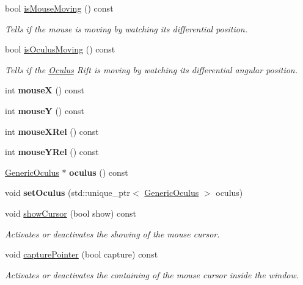 \begin{DoxyCompactItemize}
\item 
bool \hyperlink{classInput_a3b6c9efa09e69765fd65d1a33bccc8d2}{is\+Mouse\+Moving} () const 
\begin{DoxyCompactList}\small\item\em Tells if the mouse is moving by watching its differential position. \end{DoxyCompactList}\item 
bool \hyperlink{classInput_a58c6efa3f40b91303082f110de53d3f6}{is\+Oculus\+Moving} () const 
\begin{DoxyCompactList}\small\item\em Tells if the \hyperlink{classOculus}{Oculus} Rift is moving by watching its differential angular position. \end{DoxyCompactList}\item 
\hypertarget{classInput_a8ac03b246ba70872b33f8d07e9d112ea}{}int {\bfseries mouse\+X} () const \label{classInput_a8ac03b246ba70872b33f8d07e9d112ea}

\item 
\hypertarget{classInput_a3fc2746389b41d399382a70ef9274293}{}int {\bfseries mouse\+Y} () const \label{classInput_a3fc2746389b41d399382a70ef9274293}

\item 
\hypertarget{classInput_a4ea40bc98f495e60ca31b2c30e4db881}{}int {\bfseries mouse\+X\+Rel} () const \label{classInput_a4ea40bc98f495e60ca31b2c30e4db881}

\item 
\hypertarget{classInput_af2bd0c0f5e6b02225e6e433274cf733b}{}int {\bfseries mouse\+Y\+Rel} () const \label{classInput_af2bd0c0f5e6b02225e6e433274cf733b}

\item 
\hypertarget{classInput_a02286400f531ce70242e74835494877f}{}\hyperlink{classGenericOculus}{Generic\+Oculus} $\ast$ {\bfseries oculus} () const \label{classInput_a02286400f531ce70242e74835494877f}

\item 
\hypertarget{classInput_af62b5d0302086edc1d63f0e8354e84d1}{}void {\bfseries set\+Oculus} (std\+::unique\+\_\+ptr$<$ \hyperlink{classGenericOculus}{Generic\+Oculus} $>$ oculus)\label{classInput_af62b5d0302086edc1d63f0e8354e84d1}

\item 
void \hyperlink{classInput_a94bb57a699f733be6356eb4c5c392548}{show\+Cursor} (bool show) const 
\begin{DoxyCompactList}\small\item\em Activates or deactivates the showing of the mouse cursor. \end{DoxyCompactList}\item 
void \hyperlink{classInput_a5669c45f85df3e647d93d111b0b5db38}{capture\+Pointer} (bool capture) const 
\begin{DoxyCompactList}\small\item\em Activates or deactivates the containing of the mouse cursor inside the window. \end{DoxyCompactList}\end{DoxyCompactItemize}


